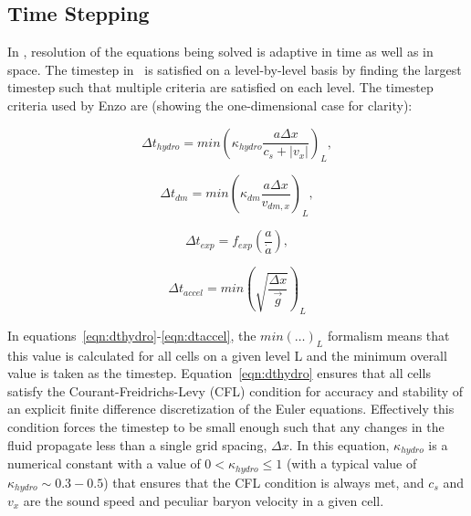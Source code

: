 \subsection{Time Stepping}
\label{sec.timestepping}


In \enzo, resolution of the equations being solved is adaptive in time 
as well as in space.  The timestep in \enzo\ is satisfied on a level-by-level
 basis by finding the largest timestep such that multiple criteria are
satisfied on each level.  The timestep criteria used by Enzo are 
(showing the one-dimensional case for clarity):

\begin{equation}
\Delta t_{hydro} = min \left( \kappa_{hydro} \frac{a \Delta x}{c_{s} + |v_x|} \right)_L ,
\label{eqn:dthydro}
\end{equation}

\begin{equation}
\Delta t_{dm} = min \left(\kappa_{dm} \frac{a \Delta x}{v_{dm,x}} \right)_L ,
\label{eqn:dtdarkmatter}
\end{equation}

\begin{equation}
\Delta t_{exp} = f_{exp} \left( \frac{a}{\dot{a}} \right) ,
\label{eqn:dtexpand}
\end{equation}

\begin{equation}
\Delta t_{accel} = min \left( \sqrt{\frac{\Delta x}{\vec{g}}} \right)_L 
\label{eqn:dtaccel}
\end{equation}

 In equations~\ref{eqn:dthydro}-\ref{eqn:dtaccel}, the $min ( \ldots )_L$
formalism means that this value is calculated for all cells on a given level
L and the minimum overall value is taken as the timestep.  
Equation~\ref{eqn:dthydro} ensures that all cells satisfy the 
Courant-Freidrichs-Levy (CFL) condition for accuracy and stability of an explicit
finite difference discretization of the Euler equations.  Effectively this condition
forces the timestep to be small enough such that any changes in the fluid propagate
less than a single grid spacing, $\Delta x$.  In this equation, $\kappa_{hydro}$ is 
a numerical constant with a value of $0 < \kappa_{hydro} \leq 1$ (with a typical
value of $\kappa_{hydro} \sim 0.3-0.5$) that ensures that the CFL condition is always
met, and $c_s$ and $v_x$ are the sound speed and peculiar baryon
velocity in a given cell.

